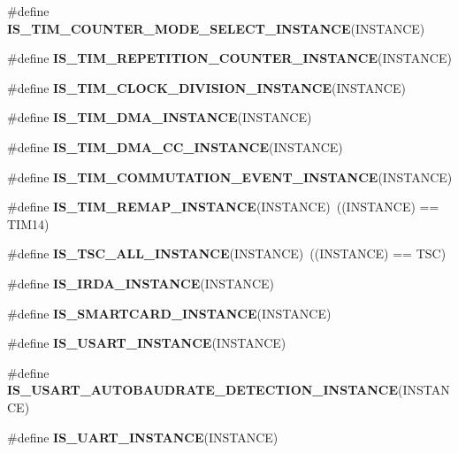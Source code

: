 \begin{DoxyCompactItemize}
\item 
\#define {\bfseries I\+S\+\_\+\+T\+I\+M\+\_\+\+C\+O\+U\+N\+T\+E\+R\+\_\+\+M\+O\+D\+E\+\_\+\+S\+E\+L\+E\+C\+T\+\_\+\+I\+N\+S\+T\+A\+N\+CE}(I\+N\+S\+T\+A\+N\+CE)
\item 
\#define {\bfseries I\+S\+\_\+\+T\+I\+M\+\_\+\+R\+E\+P\+E\+T\+I\+T\+I\+O\+N\+\_\+\+C\+O\+U\+N\+T\+E\+R\+\_\+\+I\+N\+S\+T\+A\+N\+CE}(I\+N\+S\+T\+A\+N\+CE)
\item 
\#define {\bfseries I\+S\+\_\+\+T\+I\+M\+\_\+\+C\+L\+O\+C\+K\+\_\+\+D\+I\+V\+I\+S\+I\+O\+N\+\_\+\+I\+N\+S\+T\+A\+N\+CE}(I\+N\+S\+T\+A\+N\+CE)
\item 
\#define {\bfseries I\+S\+\_\+\+T\+I\+M\+\_\+\+D\+M\+A\+\_\+\+I\+N\+S\+T\+A\+N\+CE}(I\+N\+S\+T\+A\+N\+CE)
\item 
\#define {\bfseries I\+S\+\_\+\+T\+I\+M\+\_\+\+D\+M\+A\+\_\+\+C\+C\+\_\+\+I\+N\+S\+T\+A\+N\+CE}(I\+N\+S\+T\+A\+N\+CE)
\item 
\#define {\bfseries I\+S\+\_\+\+T\+I\+M\+\_\+\+C\+O\+M\+M\+U\+T\+A\+T\+I\+O\+N\+\_\+\+E\+V\+E\+N\+T\+\_\+\+I\+N\+S\+T\+A\+N\+CE}(I\+N\+S\+T\+A\+N\+CE)
\item 
\mbox{\label{group___exported__macro_ga6bb03cf116b07bfe1bd527f8ab61a7f9}} 
\#define {\bfseries I\+S\+\_\+\+T\+I\+M\+\_\+\+R\+E\+M\+A\+P\+\_\+\+I\+N\+S\+T\+A\+N\+CE}(I\+N\+S\+T\+A\+N\+CE)~((I\+N\+S\+T\+A\+N\+CE) == T\+I\+M14)
\item 
\mbox{\label{group___exported__macro_gaf29af2609f6b7748104a965262e95475}} 
\#define {\bfseries I\+S\+\_\+\+T\+S\+C\+\_\+\+A\+L\+L\+\_\+\+I\+N\+S\+T\+A\+N\+CE}(I\+N\+S\+T\+A\+N\+CE)~((I\+N\+S\+T\+A\+N\+CE) == T\+SC)
\item 
\#define {\bfseries I\+S\+\_\+\+I\+R\+D\+A\+\_\+\+I\+N\+S\+T\+A\+N\+CE}(I\+N\+S\+T\+A\+N\+CE)
\item 
\#define {\bfseries I\+S\+\_\+\+S\+M\+A\+R\+T\+C\+A\+R\+D\+\_\+\+I\+N\+S\+T\+A\+N\+CE}(I\+N\+S\+T\+A\+N\+CE)
\item 
\#define {\bfseries I\+S\+\_\+\+U\+S\+A\+R\+T\+\_\+\+I\+N\+S\+T\+A\+N\+CE}(I\+N\+S\+T\+A\+N\+CE)
\item 
\#define {\bfseries I\+S\+\_\+\+U\+S\+A\+R\+T\+\_\+\+A\+U\+T\+O\+B\+A\+U\+D\+R\+A\+T\+E\+\_\+\+D\+E\+T\+E\+C\+T\+I\+O\+N\+\_\+\+I\+N\+S\+T\+A\+N\+CE}(I\+N\+S\+T\+A\+N\+CE)
\item 
\#define {\bfseries I\+S\+\_\+\+U\+A\+R\+T\+\_\+\+I\+N\+S\+T\+A\+N\+CE}(I\+N\+S\+T\+A\+N\+CE)
\item 

\end{DoxyCompactItemize}
